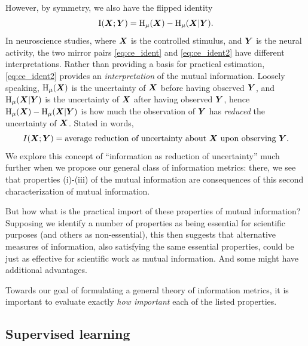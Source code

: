 \documentclass[12pt]{article}
\begin{document}
However, by symmetry, we also have the flipped identity
\begin{equation}\label{eq:ce_ident2}
\text{I}(\boldsymbol{X}; \boldsymbol{Y}) = \text{H}_\mu(\boldsymbol{X}) - \text{H}_\mu(\boldsymbol{X}|\boldsymbol{Y}).
\end{equation}
In neuroscience studies, where $\boldsymbol{X}$ is the controlled stimulus, and
$\boldsymbol{Y}$ is the neural activity, the two mirror pairs \eqref{eq:ce_ident}
and \eqref{eq:ce_ident2} have different interpretations.  Rather than
providing a basis for practical estimation, \eqref{eq:ce_ident2}
provides an \emph{interpretation} of the mutual information.  Loosely
speaking, $\text{H}_\mu(\boldsymbol{X})$ is the uncertainty of $\boldsymbol{X}$ before
having observed $\boldsymbol{Y}$, and $\text{H}_\mu(\boldsymbol{X}|\boldsymbol{Y})$ is the uncertainty
of $\boldsymbol{X}$ after having observed $\boldsymbol{Y}$, hence $\text{H}_\mu(\boldsymbol{X})
- \text{H}_\mu(\boldsymbol{X}|\boldsymbol{Y})$ is how much the observation of $\boldsymbol{Y}$
has \emph{reduced} the uncertainty of $\boldsymbol{X}$.  Stated in words,
\[
I(\boldsymbol{X}; \boldsymbol{Y}) = \text{average reduction of uncertainty about $\boldsymbol{X}$ upon observing $\boldsymbol{Y}$}.
\]
We explore this concept of ``information as reduction of uncertainty''
much further when we propose our general class of information metrics:
there, we see that properties (i)-(iii) of the mutual information are
consequences of this second characterization of mutual information.

But how what is the practical import of these properties of mutual
information?  Supposing we identify a number of properties as being
essential for scientific purposes (and others as non-essential), this
then suggests that alternative measures of information, also
satisfying the same essential properties, could be just as effective
for scientific work as mutual information.  And some might have
additional advantages.

Towards our goal of formulating a general theory of information
metrics, it is important to evaluate exactly \emph{how important} each
of the listed properties.

\subsection{Supervised learning}
\end{document}
